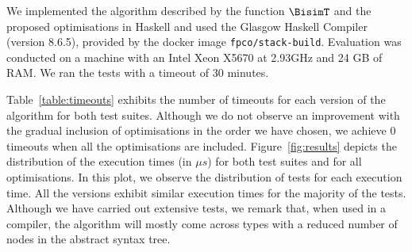 We implemented the algorithm described by the function $\BisimT$ 
and the proposed optimisations
in
Haskell and used the Glasgow Haskell Compiler (version
8.6.5), provided by the docker image
\texttt{fpco/stack-build}. 
Evaluation was conducted on a machine with
an Intel Xeon X5670 at 2.93GHz and 24 GB of RAM.
We ran the tests with a timeout of 30 minutes. 

Table~\ref{table:timeouts} 
exhibits the number of timeouts for each version of the algorithm for both
test suites. 
Although we do not observe an improvement with the gradual
inclusion of optimisations in the order we have chosen,
we achieve 0 timeouts when all the optimisations are included.
%
%
%
Figure~\ref{fig:results} depicts the distribution of the execution
times (in $\mu s$) for both test suites and for all optimisations. 
In this plot, we observe the distribution of tests for each execution time.
All the versions exhibit similar execution times for the majority 
of the tests.
Although we have carried out extensive tests, we remark that, when used 
in a compiler, the algorithm will mostly come across types with a reduced 
number of nodes in the abstract syntax tree.

